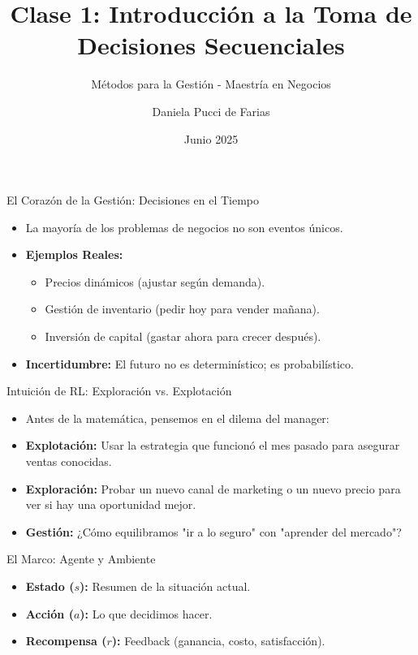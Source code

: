 \documentclass{beamer}
\title{Clase 1: Introducción a la Toma de Decisiones Secuenciales}
\subtitle{Métodos para la Gestión - Maestría en Negocios}
\author{Daniela Pucci de Farias}
\institute{Universidad Torcuato Di Tella}
\date{Junio 2025}
\begin{document}
\frame{\titlepage}

\begin{frame}{El Corazón de la Gestión: Decisiones en el Tiempo}
\begin{itemize}
    \item La mayoría de los problemas de negocios no son eventos únicos.
    \item \textbf{Ejemplos Reales:}
    \begin{itemize}
        \item Precios dinámicos (ajustar según demanda).
        \item Gestión de inventario (pedir hoy para vender mañana).
        \item Inversión de capital (gastar ahora para crecer después).
    \end{itemize}
    \item \textbf{Incertidumbre:} El futuro no es determinístico; es probabilístico.
\end{itemize}
\end{frame}

\begin{frame}{Intuición de RL: Exploración vs. Explotación}
\begin{itemize}
    \item Antes de la matemática, pensemos en el dilema del manager:
    \item \textbf{Explotación:} Usar la estrategia que funcionó el mes pasado para asegurar ventas conocidas.
    \item \textbf{Exploración:} Probar un nuevo canal de marketing o un nuevo precio para ver si hay una oportunidad mejor.
    \item \textbf{Gestión:} ¿Cómo equilibramos "ir a lo seguro" con "aprender del mercado"?
\end{itemize}
\end{frame}

\begin{frame}{El Marco: Agente y Ambiente}
\centering
{}
\begin{itemize}
    \item \textbf{Estado ($s$):} Resumen de la situación actual.
    \item \textbf{Acción ($a$):} Lo que decidimos hacer.
    \item \textbf{Recompensa ($r$):} Feedback (ganancia, costo, satisfacción).
\end{itemize}
\end{frame}
\end{document}
